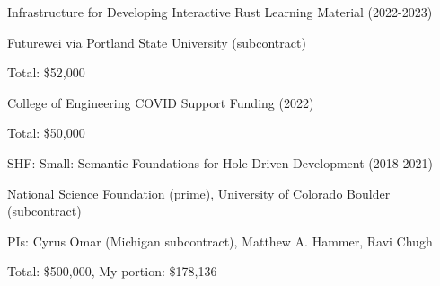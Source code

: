 \documentclass[10pt,letterpaper]{article}
\renewenvironment{itemize}{
  \begin{list}{}{
    \setlength{\leftmargin}{1.25em}
    \setlength{\itemsep}{0.25em}
    \setlength{\parskip}{0pt}
    \setlength{\parsep}{0.2em}
  }
}{
  \end{list}
}
\begin{document}
\begin{itemize}
  \item Infrastructure for Developing Interactive Rust Learning Material (2022-2023)
        \begin{itemize}
          \item Futurewei via Portland State University (subcontract)
          \item Total: \$52,000
        \end{itemize}
  \item College of Engineering COVID Support Funding (2022)
        \begin{itemize}
          \item Total: \$50,000
        \end{itemize}
  \item SHF: Small: Semantic Foundations for Hole-Driven Development (2018-2021)
        \begin{itemize}
          \item National Science Foundation (prime), University of Colorado Boulder (subcontract)
          \item PIs: Cyrus Omar (Michigan subcontract), Matthew A. Hammer, Ravi Chugh
          \item Total: \$500,000, My portion: \$178,136
        \end{itemize}
\end{itemize}

\end{document}
